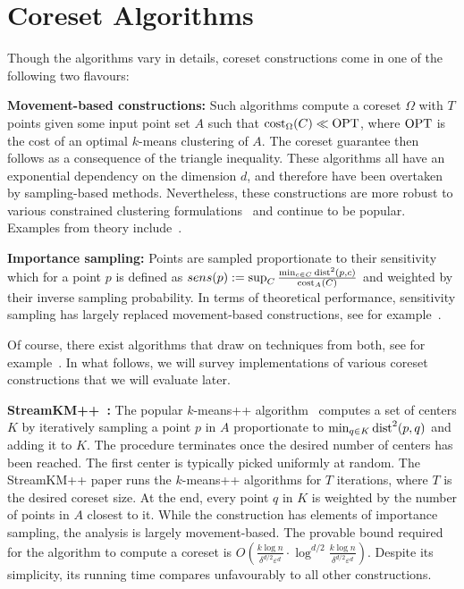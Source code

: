 \section{Coreset Algorithms}
\label{sec:algorithms}

Though the algorithms vary in details, coreset constructions come in one of the following two flavours:

{\bf Movement-based constructions:} Such algorithms compute a coreset $\Omega$ with $T$ points given some input point set $A$ such that $\text{cost}_{\Omega}(C)\ll \text{OPT}$, where $\text{OPT}$ is the cost of an optimal $k$-means clustering of $A$. 
The coreset guarantee then follows as a consequence of the triangle inequality. These algorithms all have an exponential dependency on the dimension $d$, and therefore have been overtaken by sampling-based methods. Nevertheless, these constructions are more robust to various constrained clustering formulations~\cite{HuangJV19,SSS19} and continue to be popular. Examples from theory include~\cite{FrahlS2005,HaM04}. 

{\bf Importance sampling:} Points are sampled proportionate to their sensitivity which for a point $p$ is defined as $sens(p):=\sup_{C} \frac{\min_{c\in C} \text{dist}^2(p,c)}{\text{cost}_A(C)}$ and weighted by their inverse sampling probability. In terms of theoretical performance, sensitivity sampling has largely replaced movement-based constructions, see for example~\cite{FeldmanL11,LangbergS10}.  

Of course, there exist algorithms that draw on techniques from both, see for example~\cite{Cohen-AddadSS21}. In what follows, we will survey implementations of various coreset constructions that we will evaluate later.


{\bf StreamKM++~\cite{AckermannMRSLS12}:} The popular $k$-means++ algorithm~\cite{ArV07} computes a set of centers $K$ by iteratively sampling a point $p$ in $A$ proportionate to $\min_{q\in K} \text{dist}^2(p,q)$ and adding it to $K$. The procedure terminates once the desired number of centers has been reached. The first center is typically picked uniformly at random.
The StreamKM++ paper runs the $k$-means++ algorithms for $T$ iterations, where $T$ is the desired coreset size. At the end, every point $q$ in $K$ is weighted by the number of points in $A$ closest to it. While the construction has elements of importance sampling, the analysis is largely movement-based. The provable bound required for the algorithm to compute a coreset is $O\left(\frac{k\log n}{\delta^{d/2}\varepsilon^d}\cdot \log^{d/2} \frac{k\log n}{\delta^{d/2}\varepsilon^d}\right)$. Despite its simplicity, its running time compares unfavourably to all other constructions.

